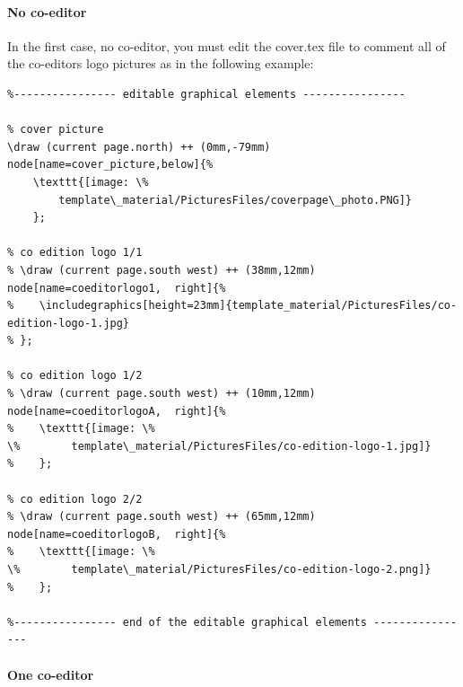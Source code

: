 \documentclass[Theme1]{{template_material/eurostat}}
\begin{document}
\newpage
\paragraph{No co-editor}

In the first case, no co-editor, you must edit the cover.tex file to comment all of the co-editors logo pictures as in the following example:

\begin{verbatim}
%---------------- editable graphical elements ----------------
    
% cover picture
\draw (current page.north) ++ (0mm,-79mm) node[name=cover_picture,below]{%
    \texttt{[image: \%
        template\_material/PicturesFiles/coverpage\_photo.PNG]}
    };

% co edition logo 1/1
% \draw (current page.south west) ++ (38mm,12mm) node[name=coeditorlogo1,  right]{%
%    \includegraphics[height=23mm]{template_material/PicturesFiles/co-edition-logo-1.jpg}
% }; 
     
% co edition logo 1/2
% \draw (current page.south west) ++ (10mm,12mm) node[name=coeditorlogoA,  right]{%
%    \texttt{[image: \%
\%        template\_material/PicturesFiles/co-edition-logo-1.jpg]}
%    }; 
     
% co edition logo 2/2
% \draw (current page.south west) ++ (65mm,12mm) node[name=coeditorlogoB,  right]{%
%    \texttt{[image: \%
\%        template\_material/PicturesFiles/co-edition-logo-2.png]}
%    }; 

%---------------- end of the editable graphical elements ----------------
\end{verbatim}

\paragraph{One co-editor}
\end{document}
